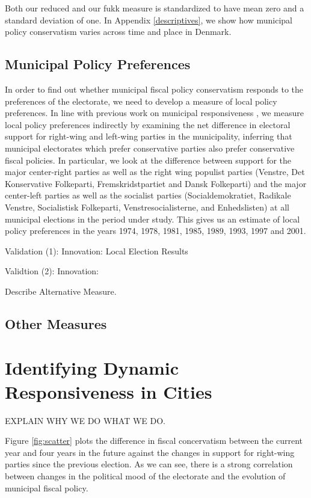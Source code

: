 \documentclass[a4paper,12pt]{article}
\begin{document}
Both our reduced and our fukk measure is standardized to have mean zero and a standard deviation of one. In Appendix \ref{descriptives}, we show how municipal policy conservatism varies across time and place in Denmark.



\subsection*{Municipal Policy Preferences}

In order to find out whether municipal fiscal policy conservatism responds to the preferences of the electorate, we need to develop a measure of local policy preferences. In line with previous work on municipal responsiveness \cite[e.g.,][]{sances2017ideology,einstein2016pushing}, we measure local policy preferences indirectly by examining the net difference in electoral support for right-wing and left-wing parties in the municipality, inferring that municipal electorates which prefer conservative parties also prefer conservative fiscal policies. In particular, we look at the difference between support for the major center-right parties as well as the right wing populist parties (Venstre, Det Konservative Folkeparti, Fremskridstpartiet and Dansk Folkeparti) and the major center-left parties as well as the socialist parties (Socialdemokratiet, Radikale Venstre, Socialistisk Folkeparti, Venstresocialisterne, and Enhedslisten) at all municipal elections in the period under study. This gives us an estimate of local policy preferences in the years 1974, 1978, 1981, 1985, 1989, 1993, 1997 and 2001. 

Validation (1): Innovation: Local Election Results

Validtion (2): Innovation: 

Describe Alternative Measure.

\subsection*{Other Measures}

\section*{Identifying Dynamic Responsiveness in Cities}
EXPLAIN WHY WE DO WHAT WE DO. 

Figure \ref{fig:scatter} plots the difference in fiscal concervatism between the current year and four years in the future against the changes in support for right-wing parties since the previous election.  As we can see, there is a strong correlation between changes in the political mood of the electorate and the evolution of municipal fiscal policy.
\end{document}
